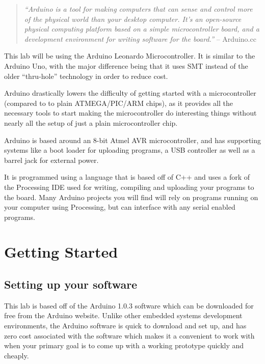 \documentclass[11pt,a4paper]{article}
\begin{document}
\begin{quote}
\emph{``Arduino is a tool for making computers that can sense and control more of the physical world than your desktop computer. It's an open-source physical computing platform based on a simple microcontroller board, and a development environment for writing software for the board.''} -- Arduino.cc\cite{arduino_guide}
\end{quote}

This lab will be using the Arduino Leonardo Microcontroller\cite{leonardo}.  It is similar to the Arduino Uno\cite{uno}, with the major difference being that it uses SMT\cite{smt} instead of the older ``thru-hole''\cite{th} technology in order to reduce cost.

Arduino drastically lowers the difficulty of getting started with a microcontroller (compared to to plain ATMEGA/PIC/ARM chips), as it provides all the necessary tools to start making the microcontroller do interesting things without nearly all the setup of just a plain microcontroller chip.

Arduino is based around an 8-bit Atmel AVR microcontroller, and has supporting systems like a boot loader for uploading programs, a USB controller as well as a barrel jack for external power.

It is programmed using a language that is based off of C++ and uses a fork of the Processing IDE used for writing, compiling and uploading your programs to the board.  Many Arduino projects you will find will rely on programs running on your computer using Processing, but can interface with any serial enabled programs.\cite{processing}




\section{Getting Started} %
\label{sec:getting_started}

\subsection{Setting up your software} %

This lab is based off of the Arduino 1.0.3 software which can be downloaded for free from the Arduino website.\cite{arduino_dl}  Unlike other embedded systems development environments, the Arduino software is quick to download and set up, and has zero cost associated with the software which makes it a convenient to work with when your primary goal is to come up with a working prototype quickly and cheaply.
\end{document}
